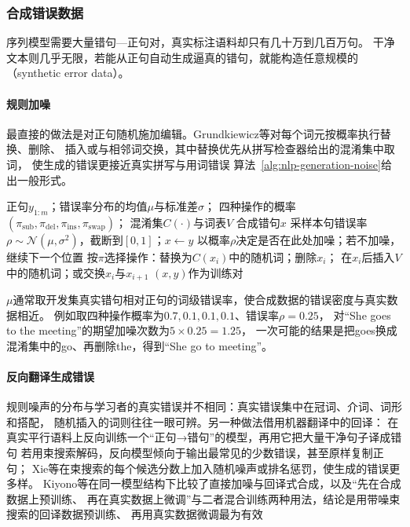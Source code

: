 \subsubsection{合成错误数据}
\label{sec:nlp-generation-synthetic-errors}

序列模型需要大量错句—正句对，真实标注语料却只有几十万到几百万句。
干净文本则几乎无限，若能从正句自动生成逼真的错句，就能构造任意规模的
（synthetic error data）。

\paragraph{规则加噪}
最直接的做法是对正句随机施加编辑。Grundkiewicz等对每个词元按概率执行替换、删除、
插入或与相邻词交换，其中替换优先从拼写检查器给出的混淆集中取词，
使生成的错误更接近真实拼写与用词错误
算法~\ref{alg:nlp-generation-noise}给出一般形式。

\begin{algorithm}[规则加噪生成错句]
  \label{alg:nlp-generation-noise}
  \begin{algorithmic}[1]
    \Require 正句$y_{1:m}$；错误率分布的均值$\mu$与标准差$\sigma$；
      四种操作的概率$(\pi_{\mathrm{sub}},\pi_{\mathrm{del}},\pi_{\mathrm{ins}},\pi_{\mathrm{swap}})$；
      混淆集$C(\cdot)$与词表$V$
    \Ensure 合成错句$x$
    \State 采样本句错误率$\rho\sim\mathcal{N}(\mu,\sigma^2)$，截断到$[0,1]$；$x\gets y$
      \State 以概率$\rho$决定是否在此处加噪；若不加噪，继续下一个位置
      \State 按$\pi$选择操作：替换为$C(x_i)$中的随机词；删除$x_i$；
        在$x_i$后插入$V$中的随机词；或交换$x_i$与$x_{i+1}$
    \EndFor
    \State \Return $(x,y)$作为训练对
  \end{algorithmic}
\end{algorithm}

$\mu$通常取开发集真实错句相对正句的词级错误率，使合成数据的错误密度与真实数据相近。
例如取四种操作概率为$0.7,0.1,0.1,0.1$、错误率$\rho=0.25$，
对“She goes to the meeting”的期望加噪次数为$5\times0.25=1.25$，
一次可能的结果是把goes换成混淆集中的go、再删除the，得到“She go to meeting”。

\paragraph{反向翻译生成错误}
规则噪声的分布与学习者的真实错误并不相同：真实错误集中在冠词、介词、词形和搭配，
随机插入的词则往往一眼可辨。另一种做法借用机器翻译中的回译：
在真实平行语料上反向训练一个“正句→错句”的模型，再用它把大量干净句子译成错句
若用束搜索解码，反向模型倾向于输出最常见的少数错误，甚至原样复制正句；
Xie等在束搜索的每个候选分数上加入随机噪声或排名惩罚，使生成的错误更多样。
Kiyono等在同一模型结构下比较了直接加噪与回译式合成，以及“先在合成数据上预训练、
再在真实数据上微调”与二者混合训练两种用法，结论是用带噪束搜索的回译数据预训练、
再用真实数据微调最为有效

